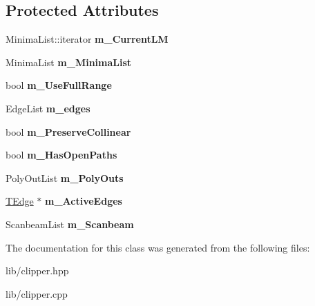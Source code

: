 \subsection*{Protected Attributes}
\begin{DoxyCompactItemize}
\item 
\mbox{\label{class_clipper_lib_1_1_clipper_base_ab6ed40f62810c0f894878c79d74afb36}} 
Minima\+List\+::iterator {\bfseries m\+\_\+\+Current\+LM}
\item 
\mbox{\label{class_clipper_lib_1_1_clipper_base_a970749dc12a20e980c932af040f8a8c5}} 
Minima\+List {\bfseries m\+\_\+\+Minima\+List}
\item 
\mbox{\label{class_clipper_lib_1_1_clipper_base_aea11d183617adc12d7ba2b84533f7f45}} 
bool {\bfseries m\+\_\+\+Use\+Full\+Range}
\item 
\mbox{\label{class_clipper_lib_1_1_clipper_base_a8bfc007c0c0afd4e9d252dac0ef5daa0}} 
Edge\+List {\bfseries m\+\_\+edges}
\item 
\mbox{\label{class_clipper_lib_1_1_clipper_base_aad4ca0f2a16a6fb466036b36cc5ff638}} 
bool {\bfseries m\+\_\+\+Preserve\+Collinear}
\item 
\mbox{\label{class_clipper_lib_1_1_clipper_base_aa2508f5b2a599294c359271506441fbd}} 
bool {\bfseries m\+\_\+\+Has\+Open\+Paths}
\item 
\mbox{\label{class_clipper_lib_1_1_clipper_base_adf118fa61f0bd00de746b8dd2b01a2cb}} 
Poly\+Out\+List {\bfseries m\+\_\+\+Poly\+Outs}
\item 
\mbox{\label{class_clipper_lib_1_1_clipper_base_afff39cdfe073a817d45e9e3ac12d68c1}} 
\hyperlink{struct_clipper_lib_1_1_t_edge}{T\+Edge} $\ast$ {\bfseries m\+\_\+\+Active\+Edges}
\item 
\mbox{\label{class_clipper_lib_1_1_clipper_base_a74dba851f53114c06257d407bbcc170e}} 
Scanbeam\+List {\bfseries m\+\_\+\+Scanbeam}
\end{DoxyCompactItemize}


The documentation for this class was generated from the following files\+:\begin{DoxyCompactItemize}
\item 
lib/clipper.\+hpp\item 
lib/clipper.\+cpp\end{DoxyCompactItemize}
